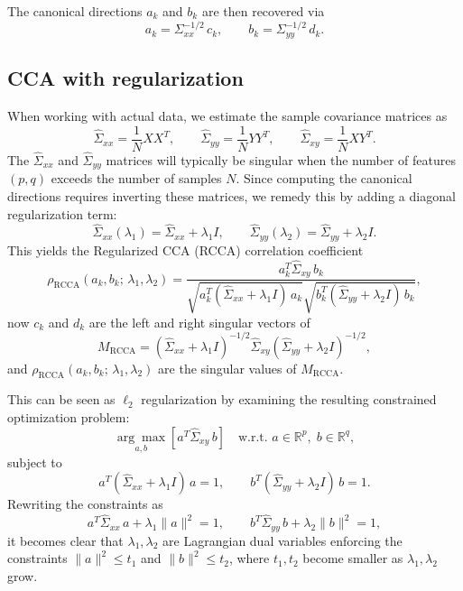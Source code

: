 \documentclass[11pt]{article}
\begin{document}
The canonical directions $a_k$ and $b_k$ are then recovered via
\[
    a_k = \Sigma_{xx}^{-1/2}\, c_k, \qquad b_k = \Sigma_{yy}^{-1/2}\, d_k.
\]

\subsection{CCA with regularization}

When working with actual data, we estimate the sample covariance matrices as
\[
    \widehat{\Sigma}_{xx} = \frac{1}{N} X X^T, \qquad
    \widehat{\Sigma}_{yy} = \frac{1}{N} Y Y^T, \qquad
    \widehat{\Sigma}_{xy} = \frac{1}{N} X Y^T.
\]
The $\widehat{\Sigma}_{xx}$ and $\widehat{\Sigma}_{yy}$ matrices will typically be singular when the number of features $(p, q)$ exceeds the number of samples $N$. Since computing the canonical directions requires inverting these matrices, we remedy this by adding a diagonal regularization term:
\[
    \widehat{\Sigma}_{xx}(\lambda_1) = \widehat{\Sigma}_{xx} + \lambda_1 I, \qquad
    \widehat{\Sigma}_{yy}(\lambda_2) = \widehat{\Sigma}_{yy} + \lambda_2 I.
\]
This yields the Regularized CCA (RCCA) correlation coefficient \cite{tuzhilinaCanonicalCorrelationAnalysis2023}
\[
    \rho_{\mathrm{RCCA}}(a_k, b_k;\, \lambda_1, \lambda_2)
    = \frac{a_k^T \widehat{\Sigma}_{xy}\, b_k}
           {\sqrt{a_k^T(\widehat{\Sigma}_{xx} + \lambda_1 I)\,a_k}
            \sqrt{b_k^T(\widehat{\Sigma}_{yy} + \lambda_2 I)\,b_k}},
\]
now $c_k$ and $d_k$ are the left and right singular vectors of
\[
    M_{\mathrm{RCCA}} = \left(\widehat{\Sigma}_{xx} + \lambda_1 I\right)^{-1/2}
                         \widehat{\Sigma}_{xy}
                         \left(\widehat{\Sigma}_{yy} + \lambda_2 I\right)^{-1/2},
\]
and $\rho_{\mathrm{RCCA}}(a_k, b_k;\, \lambda_1, \lambda_2)$ are the singular values of $M_{\mathrm{RCCA}}$.

This can be seen as $\ell_2$ regularization by examining the resulting constrained optimization problem:
\[
    \underset{a,b}{\arg\max}\left[a^T \widehat{\Sigma}_{xy}\, b\right]
    \quad \text{w.r.t. } a \in \mathbb{R}^p,\; b \in \mathbb{R}^q,
\]
subject to
\[
    a^T(\widehat{\Sigma}_{xx} + \lambda_1 I)\,a = 1, \qquad
    b^T(\widehat{\Sigma}_{yy} + \lambda_2 I)\,b = 1.
\]
Rewriting the constraints as
\[
    a^T \widehat{\Sigma}_{xx}\, a + \lambda_1 \|a\|^2 = 1, \qquad
    b^T \widehat{\Sigma}_{yy}\, b + \lambda_2 \|b\|^2 = 1,
\]
it becomes clear that $\lambda_1, \lambda_2$ are Lagrangian dual variables enforcing the constraints $\|a\|^2 \leq t_1$ and $\|b\|^2 \leq t_2$, where $t_1, t_2$ become smaller as $\lambda_1, \lambda_2$ grow.
\end{document}

